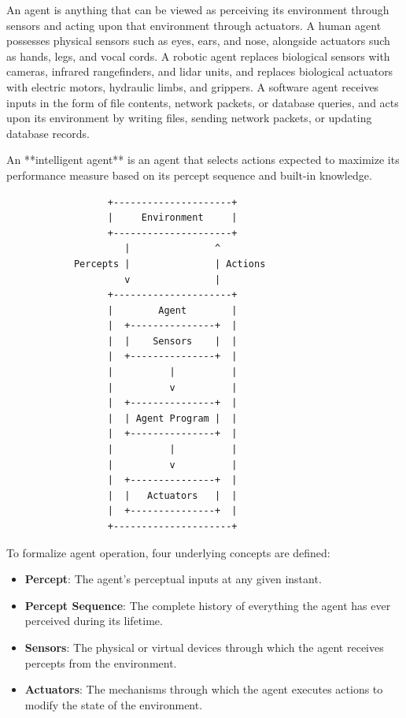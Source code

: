 \documentclass[12pt]{report}
\begin{document}
An agent is anything that can be viewed as perceiving its environment through sensors and acting upon that environment through actuators. A human agent possesses physical sensors such as eyes, ears, and nose, alongside actuators such as hands, legs, and vocal cords. A robotic agent replaces biological sensors with cameras, infrared rangefinders, and lidar units, and replaces biological actuators with electric motors, hydraulic limbs, and grippers. A software agent receives inputs in the form of file contents, network packets, or database queries, and acts upon its environment by writing files, sending network packets, or updating database records.

An **intelligent agent** is an agent that selects actions expected to maximize its performance measure based on its percept sequence and built-in knowledge. 

\begin{verbatim}
                  +---------------------+
                  |     Environment     |
                  +---------------------+
                     |               ^
            Percepts |               | Actions
                     v               |
                  +---------------------+
                  |        Agent        |
                  |  +---------------+  |
                  |  |    Sensors    |  |
                  |  +---------------+  |
                  |          |          |
                  |          v          |
                  |  +---------------+  |
                  |  | Agent Program |  |
                  |  +---------------+  |
                  |          |          |
                  |          v          |
                  |  +---------------+  |
                  |  |   Actuators   |  |
                  |  +---------------+  |
                  +---------------------+
\end{verbatim}

To formalize agent operation, four underlying concepts are defined:
\begin{itemize}
    \item \textbf{Percept}: The agent's perceptual inputs at any given instant.
    \item \textbf{Percept Sequence}: The complete history of everything the agent has ever perceived during its lifetime.
    \item \textbf{Sensors}: The physical or virtual devices through which the agent receives percepts from the environment.
    \item \textbf{Actuators}: The mechanisms through which the agent executes actions to modify the state of the environment.
\end{itemize}
\end{document}
